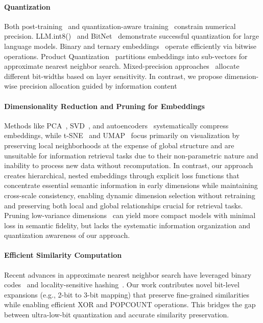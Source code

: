 \paragraph{Quantization}
Both post-training~\cite{jacob2018quantization} and quantization-aware training~\cite{hubara2017quantized,mishra2018apprentice} constrain numerical precision. LLM.int8()~\cite{dettmers2022llm} and BitNet~\cite{wang2023bitnet} demonstrate successful quantization for large language models.
Binary and ternary embeddings~\cite{shen2018nash, shu2018compressing} operate efficiently via bitwise operations. 
Product Quantization~\cite{jegou2010product} partitions embeddings into sub-vectors for approximate nearest neighbor search.
Mixed-precision approaches~\cite{dong2019hawq,wang2019haq} allocate different bit-widths based on layer sensitivity. 
In contrast, we propose dimension-wise precision allocation guided by information content

\paragraph{Dimensionality Reduction and Pruning for Embeddings}
Methods like PCA~\cite{jolliffe2016principal}, SVD~\cite{golub1971singular}, and autoencoders~\cite{hinton2006reducing} systematically compress embeddings, while t-SNE~\cite{maaten2008visualizing} and UMAP~\cite{mcinnes2018umap} focus primarily on visualization by preserving local neighborhoods at the expense of global structure and are unsuitable for information retrieval tasks due to their non-parametric nature and inability to process new data without recomputation.
In contrast, our approach creates hierarchical, nested embeddings through explicit loss functions that concentrate essential semantic information in early dimensions while maintaining cross-scale consistency, enabling dynamic dimension selection without retraining and preserving both local and global relationships crucial for retrieval tasks. 
Pruning low-variance dimensions~\cite{li2016pruning} can yield more compact models with minimal loss in semantic fidelity, but lacks the systematic information organization and quantization awareness of our approach.

\paragraph{Efficient Similarity Computation}
Recent advances in approximate nearest neighbor search have leveraged binary codes~\cite{wang2017survey} and locality-sensitive hashing~\cite{andoni2006near, andoni2014beyond}. 
Our work contributes novel bit-level expansions (e.g., 2-bit to 3-bit mapping) that preserve fine-grained similarities while enabling efficient XOR and POPCOUNT operations. 
This bridges the gap between ultra-low-bit quantization and accurate similarity preservation.


